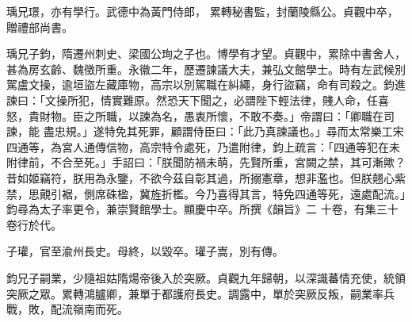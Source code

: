 \begin{pinyinscope}
 瑀兄璟，亦有學行。武德中為黃門侍郎，
 累轉秘書監，封蘭陵縣公。貞觀中卒，贈禮部尚書。



 瑀兄子鈞，隋遷州刺史、梁國公珣之子也。博學有才望。貞觀中，累除中書舍人，甚為房玄齡、魏徵所重。永徽二年，歷遷諫議大夫，兼弘文館學士。時有左武候別駕盧文操，逾垣盜左藏庫物，高宗以別駕職在糾繩，身行盜竊，命有司殺之。鈞進諫曰：「文操所犯，情實難原。然恐天下聞之，必謂陛下輕法律，賤人命，任喜怒，貴財物。臣之所職，以諫為名，愚衷所懷，不敢不奏。」帝謂曰：「卿職在司諫，能
 盡忠規。」遂特免其死罪，顧謂侍臣曰：「此乃真諫議也。」尋而太常樂工宋四通等，為宮人通傳信物，高宗特令處死，乃遣附律，鈞上疏言：「四通等犯在未附律前，不合至死。」手詔曰：「朕聞防禍未萌，先賢所重，宮闕之禁，其可漸歟？昔如姬竊符，朕用為永鑒，不欲今茲自彰其過，所搦憲章，想非濫也。但朕翹心紫禁，思覿引裾，側席硃楹，冀旌折檻。今乃喜得其言，特免四通等死，遠處配流。」鈞尋為太子率更令，兼崇賢館學士。顯慶中卒。所撰《韻旨》二
 十卷，有集三十卷行於代。



 子瓘，官至渝州長史。母終，以毀卒。瓘子嵩，別有傳。



 鈞兄子嗣業，少隨祖姑隋煬帝後入於突厥。貞觀九年歸朝，以深識蕃情充使，統領突厥之眾。累轉鴻臚卿，兼單于都護府長史。調露中，單於突厥反叛，嗣業率兵戰，敗，配流嶺南而死。




\end{pinyinscope}
